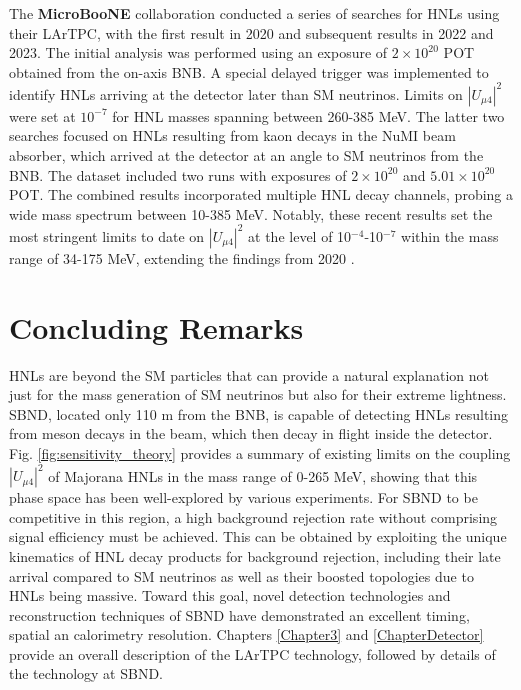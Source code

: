 \begin{coloritemize}
\item The \textbf{MicroBooNE} collaboration conducted a series of searches for HNLs using their LArTPC, with the first result in 2020 and subsequent results in 2022 and 2023.
The initial analysis was performed using an exposure of $2 \times 10^{20}$ POT obtained from the on-axis BNB.
A special delayed trigger was implemented to identify HNLs arriving at the detector later than SM neutrinos.
Limits on $|U_{\mu4}|^{2}$ were set at $10^{-7}$ for HNL masses spanning between 260-385 MeV.
The latter two searches focused on HNLs resulting from kaon decays in the NuMI beam absorber, which arrived at the detector at an angle to SM neutrinos from the BNB.
The dataset included two runs with exposures of $2 \times 10^{20}$ and $5.01 \times 10^{20}$ POT.
The combined results incorporated multiple HNL decay channels, probing a wide mass spectrum between 10-385 MeV.
Notably, these recent results set the most stringent limits to date on $|U_{\mu4}|^{2}$ at the level of 10$^{-4}$-10$^{-7}$ within the mass range of 34-175 MeV, extending the findings from 2020 \cite{uboone1, uboone2, uboone3}.

\end{coloritemize}

\section{Concluding Remarks}
\label{sec2conclude}

HNLs are beyond the SM particles that can provide a natural explanation not just for the mass generation of SM neutrinos but also for their extreme lightness.
SBND, located only 110 m from the BNB, is capable of detecting HNLs resulting from meson decays in the beam, which then decay in flight inside the detector.
Fig. \ref{fig:sensitivity_theory} provides a summary of existing limits on the coupling $|U_{\mu4}|^2$ of Majorana HNLs in the mass range of 0-265 MeV, showing that this phase space has been well-explored by various experiments.
For SBND to be competitive in this region, a high background rejection rate without comprising signal efficiency must be achieved.
This can be obtained by exploiting the unique kinematics of HNL decay products for background rejection, including their late arrival compared to SM neutrinos as well as their boosted topologies due to HNLs being massive. 
Toward this goal, novel detection technologies and reconstruction techniques of SBND have demonstrated an excellent timing, spatial an calorimetry resolution. 
Chapters \ref{Chapter3} and \ref{ChapterDetector} provide an overall description of the LArTPC technology, followed by details of the technology at SBND.
